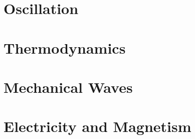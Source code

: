\documentclass[english,twoside]{labmanual} %
\begin{document}



%
%
%
%
%
%


%
%
%
%
%
%
%

\part{Oscillation}




%
%
%

\part{Thermodynamics}


%


%
%

\part{Mechanical Waves}




\part{Electricity and Magnetism}


%










\end{document}
